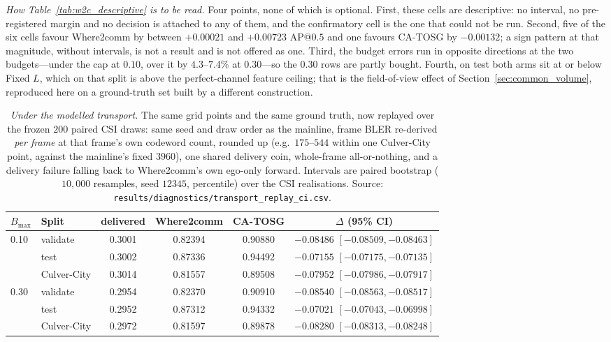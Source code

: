 \documentclass[journal]{IEEEtran}
\newcommand{\method}{CA-TOSG}
\begin{document}
\emph{How Table~\ref{tab:w2c_descriptive} is to be read.} Four points, none of which is optional.
First, these cells are descriptive: no interval, no pre-registered margin and no decision is attached
to any of them, and the confirmatory cell is the one that could not be run. Second, five of the six
cells favour Where2comm by between $+0.00021$ and $+0.00723$ AP@$0.5$ and one favours \method{} by
$-0.00132$; a sign pattern at that magnitude, without intervals, is not a result and is not offered
as one. Third, the budget errors run in opposite directions at the two budgets---under the cap at
$0.10$, over it by $4.3$--$7.4\%$ at $0.30$---so the $0.30$ rows are partly bought. Fourth, on test
both arms sit at or below Fixed $L$, which on that split is above the perfect-channel feature
ceiling; that is the field-of-view effect of Section~\ref{sec:common_volume}, reproduced here on a
ground-truth set built by a different construction.

\begin{table}[t]
\centering
\footnotesize
\setlength{\tabcolsep}{3pt}
\caption{\emph{Under the modelled transport.} The same grid points and the same ground truth, now
replayed over the frozen $200$ paired CSI draws: same seed and draw order as the mainline, frame BLER
re-derived \emph{per frame} at that frame's own codeword count, rounded up (e.g.\ $175$--$544$
within one Culver-City point, against the mainline's fixed $3960$), one shared delivery coin, whole-frame all-or-nothing, and a delivery failure
falling back to Where2comm's own ego-only forward. Intervals are paired bootstrap
($10{,}000$ resamples, seed $12345$, percentile) over the CSI realisations.
Source: \texttt{results/diagnostics/transport\_replay\_ci.csv}.}
\label{tab:w2c_transport}
\begin{tabular}{llcccc}
\toprule
$B_{\max}$ & Split & delivered & Where2comm & \method{} & $\Delta$ (95\% CI) \\
\midrule
\multirow{3}{*}{0.10}
   & validate    & 0.3001 & 0.82394 & 0.90880 & $-0.08486$ $[-0.08509,-0.08463]$ \\
   & test        & 0.3002 & 0.87336 & 0.94492 & $-0.07155$ $[-0.07175,-0.07135]$ \\
 & Culver-City & 0.3014 & 0.81557 & 0.89508 & $-0.07952$ $[-0.07986,-0.07917]$ \\
\midrule
\multirow{3}{*}{0.30}
   & validate    & 0.2954 & 0.82370 & 0.90910 & $-0.08540$ $[-0.08563,-0.08517]$ \\
  & test        & 0.2952 & 0.87312 & 0.94332 & $-0.07021$ $[-0.07043,-0.06998]$ \\
  & Culver-City & 0.2972 & 0.81597 & 0.89878 & $-0.08280$ $[-0.08313,-0.08248]$ \\
\bottomrule
\end{tabular}
\end{table}
\end{document}
